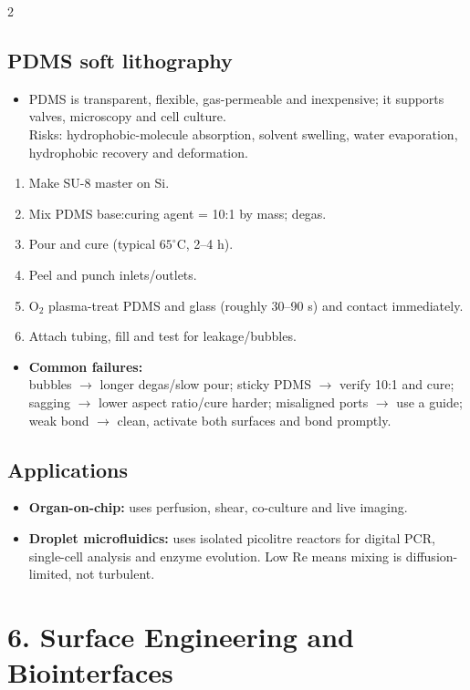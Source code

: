 \documentclass[10pt,a4paper]{ctexart}
\newcommand{\key}[1]{\textbf{#1}}
\begin{document}
\begin{multicols*}{2}
\subsection{PDMS soft lithography}
\begin{itemize}
	\item PDMS is transparent, flexible, gas-permeable and inexpensive; it supports valves, microscopy and cell culture. \\
	Risks: hydrophobic-molecule absorption, solvent swelling, water evaporation, hydrophobic recovery and deformation.
\end{itemize}
\begin{enumerate}
	\item Make SU-8 master on Si.
	\item Mix PDMS base:curing agent = 10:1 by mass; degas.
	\item Pour and cure (typical \(65^\circ\mathrm C\), 2--4 h).
	\item Peel and punch inlets/outlets.
	\item O$_2$ plasma-treat PDMS and glass (roughly 30--90 s) and contact immediately.
	\item Attach tubing, fill and test for leakage/bubbles.
\end{enumerate}
\begin{itemize}
	\item \key{Common failures:} \\
	bubbles \(\rightarrow\) longer degas/slow pour; sticky PDMS \(\rightarrow\) verify 10:1 and cure; 
	sagging \(\rightarrow\) lower aspect ratio/cure harder; misaligned ports \(\rightarrow\) use a guide; 
	weak bond \(\rightarrow\) clean, activate both surfaces and bond promptly.
\end{itemize}

\subsection{Applications}
\begin{itemize}
	\item \key{Organ-on-chip:} uses perfusion, shear, co-culture and live imaging. 
	\item \key{Droplet microfluidics:} uses isolated picolitre reactors for digital PCR, single-cell analysis and enzyme evolution. 
	Low Re means mixing is diffusion-limited, not turbulent.
\end{itemize}


\section{6. Surface Engineering and Biointerfaces}

\end{multicols*}
\end{document}

